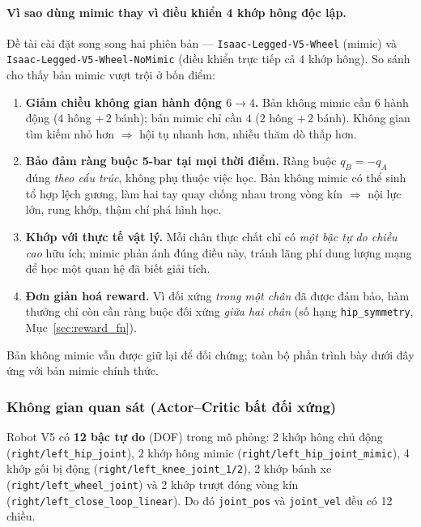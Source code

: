 \paragraph{Vì sao dùng mimic thay vì điều khiển 4 khớp hông độc lập.}
Đề tài cài đặt song song hai phiên bản — \texttt{Isaac-Legged-V5-Wheel}
(mimic) và \texttt{Isaac-Legged-V5-Wheel-NoMimic} (điều khiển trực tiếp cả
4 khớp hông). So sánh cho thấy bản mimic vượt trội ở bốn điểm:
\begin{enumerate}
    \item \textbf{Giảm chiều không gian hành động $6\to4$.} Bản không mimic
    cần 6 hành động ($4$ hông $+\,2$ bánh); bản mimic chỉ cần $4$
    ($2$ hông $+\,2$ bánh). Không gian tìm kiếm nhỏ hơn $\Rightarrow$ hội tụ
    nhanh hơn, nhiễu thăm dò thấp hơn.
    \item \textbf{Bảo đảm ràng buộc 5-bar tại mọi thời điểm.} Ràng buộc
    $q_B=-q_A$ đúng \emph{theo cấu trúc}, không phụ thuộc việc học. Bản không
    mimic có thể sinh tổ hợp lệch gương, làm hai tay quay chống nhau trong
    vòng kín $\Rightarrow$ nội lực lớn, rung khớp, thậm chí phá hình học.
    \item \textbf{Khớp với thực tế vật lý.} Mỗi chân thực chất chỉ có
    \emph{một bậc tự do chiều cao} hữu ích; mimic phản ánh đúng điều này,
    tránh lãng phí dung lượng mạng để học một quan hệ đã biết giải tích.
    \item \textbf{Đơn giản hoá reward.} Vì đối xứng \emph{trong một chân} đã
    được đảm bảo, hàm thưởng chỉ còn cần ràng buộc đối xứng
    \emph{giữa hai chân} (số hạng \texttt{hip\_symmetry},
    Mục~\ref{sec:reward_fn}).
\end{enumerate}
Bản không mimic vẫn được giữ lại để đối chứng; toàn bộ phần trình bày dưới
đây ứng với bản mimic chính thức.

\subsubsection{Không gian quan sát (Actor–Critic bất đối xứng)}
\label{sec:obs_space}

Robot V5 có \textbf{12 bậc tự do} (DOF) trong mô phỏng: 2 khớp hông chủ động
(\texttt{right/left\_hip\_joint}), 2 khớp hông mimic
(\texttt{right/left\_hip\_joint\_mimic}), 4 khớp gối bị động
(\texttt{right/left\_knee\_joint\_1/2}), 2 khớp bánh xe
(\texttt{right/left\_wheel\_joint}) và 2 khớp trượt đóng vòng kín
(\texttt{right/left\_close\_loop\_linear}). Do đó \texttt{joint\_pos} và
\texttt{joint\_vel} đều có 12 chiều.

